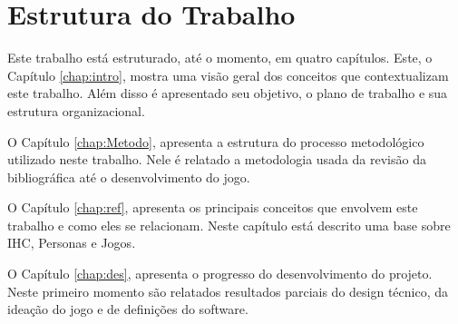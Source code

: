 \section{Estrutura do Trabalho}

Este trabalho está estruturado, até o momento, em quatro capítulos. Este, o Capítulo \ref{chap:intro}, mostra uma visão geral dos conceitos que contextualizam este trabalho. Além disso é apresentado seu objetivo, o plano de trabalho e sua estrutura organizacional.

O Capítulo \ref{chap:Metodo}, apresenta a estrutura do processo metodológico utilizado neste trabalho. Nele é relatado a metodologia usada da revisão da bibliográfica até o desenvolvimento do jogo.  

O Capítulo \ref{chap:ref}, apresenta os principais conceitos que envolvem este trabalho e como eles se relacionam. Neste capítulo está descrito uma base sobre IHC, Personas e Jogos.

{\color{textmodified}
O Capítulo \ref{chap:des}, apresenta o progresso do desenvolvimento do projeto. Neste primeiro momento são relatados resultados parciais do design técnico, da ideação do jogo e de definições do software.
}


